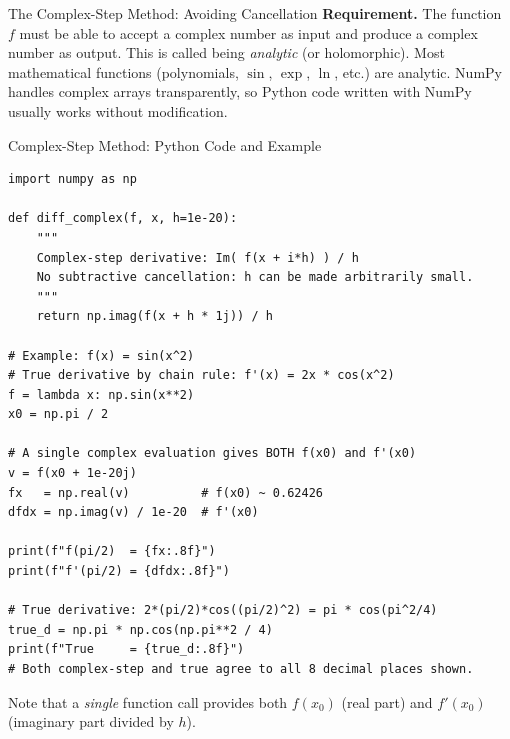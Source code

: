 \documentclass[aspectratio=169,10pt]{beamer}
\begin{document}
\begin{frame}[allowframebreaks]{The Complex-Step Method: Avoiding Cancellation}
  \textbf{Requirement.}  The function $f$ must be able to accept a complex
  number as input and produce a complex number as output.  This is
  called being \emph{analytic} (or holomorphic).  Most mathematical
  functions (polynomials, $\sin$, $\exp$, $\ln$, etc.) are analytic.
  NumPy handles complex arrays transparently, so Python code written
  with NumPy usually works without modification.

\end{frame}

\begin{frame}[fragile]{Complex-Step Method: Python Code and Example}
\begin{lstlisting}[caption={Complex-step derivative --- Python (NumPy complex arithmetic)}]
import numpy as np

def diff_complex(f, x, h=1e-20):
    """
    Complex-step derivative: Im( f(x + i*h) ) / h
    No subtractive cancellation: h can be made arbitrarily small.
    """
    return np.imag(f(x + h * 1j)) / h

# Example: f(x) = sin(x^2)
# True derivative by chain rule: f'(x) = 2x * cos(x^2)
f = lambda x: np.sin(x**2)
x0 = np.pi / 2

# A single complex evaluation gives BOTH f(x0) and f'(x0)
v = f(x0 + 1e-20j)
fx   = np.real(v)          # f(x0) ~ 0.62426
dfdx = np.imag(v) / 1e-20  # f'(x0)

print(f"f(pi/2)  = {fx:.8f}")
print(f"f'(pi/2) = {dfdx:.8f}")

# True derivative: 2*(pi/2)*cos((pi/2)^2) = pi * cos(pi^2/4)
true_d = np.pi * np.cos(np.pi**2 / 4)
print(f"True     = {true_d:.8f}")
# Both complex-step and true agree to all 8 decimal places shown.
\end{lstlisting}

\medskip
Note that a \emph{single} function call provides both $f(x_0)$ (real part)
and $f'(x_0)$ (imaginary part divided by $h$).
\end{frame}
\end{document}
